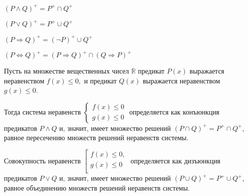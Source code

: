 $(P\land Q)^+ = P^+\cap Q^+ $

$(P\lor Q)^+=P^+\cup Q^+$

$(P\Rightarrow Q)^+=(\lnot P)^+\cup Q^+$

$(P\Leftrightarrow Q)^+ = (P\Rightarrow Q)^+\cap(Q\Rightarrow P)^+$

\begin{example}
    Пусть на множестве вещественных чисел $\mathbb{R} $ предикат $P(x)$ выражается неравенством $f(x)\leq 0,$ и предикат $Q(x)$ выражается неравенством $g(x)\leq 0$.

    Тогда система неравенств
         $\begin{cases} f(x)\leq 0 \\ g(x)\leq 0 \end{cases}$
    определяется как конъюнкция предикатов $P\land Q$ и, значит, имеет множество решений $(P\cap Q)^+=P^+\cap Q^+$, равное пересечению множеств решений неравенств системы.

    Совокупность неравенств 
    $\left[ 
      \begin{gathered} 
        f(x)\leq 0, \\ 
        g(x)\leq 0 \\ 
      \end{gathered} 
\right.$ определяется как дизъюнкция предикатов $P\lor Q$ и, значит, имеет множество решений $(P\cup Q)^+=P^+\cup Q^+$, равное объединению множеств решений неравенств системы.
\end{example}
